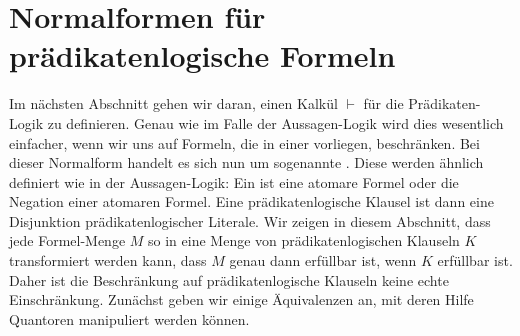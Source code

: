 \section{Normalformen für prädikatenlogische Formeln}
Im nächsten Abschnitt gehen wir daran, einen Kalkül $\vdash$ für die
Prädikaten-Logik zu definieren.  Genau wie im Falle der Aussagen-Logik wird dies wesentlich einfacher, wenn wir
uns auf Formeln, die in einer   vorliegen, beschränken.  Bei dieser Normalform handelt es sich
nun um sogenannte .  Diese werden ähnlich definiert wie in der
Aussagen-Logik:  Ein  ist eine atomare Formel oder die Negation einer
atomaren Formel.  Eine prädikatenlogische Klausel ist dann eine Disjunktion prädikatenlogischer Literale.
Wir zeigen in diesem Abschnitt, dass jede Formel-Menge $M$
so in eine Menge von prädikatenlogischen Klauseln $K$ transformiert werden kann, dass $M$ genau dann erfüllbar ist, wenn $K$
erfüllbar ist.  Daher ist die Beschränkung auf prädikatenlogische Klauseln keine echte Einschränkung.  Zunächst geben wir einige
Äquivalenzen an, mit deren Hilfe Quantoren manipuliert werden können. 

